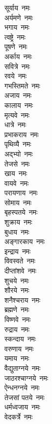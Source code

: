 \begin{multicols}{2}
    \begin{flushleft}
सूर्याय~नमः\\
अर्यमणे~नमः\\
भगाय~नमः\\
त्वष्ट्रे~नमः\\
पूषणे~नमः\\
अर्काय~नमः\\
सवित्रे~नमः\\
रवये~नमः\\
गभस्तिमते~नमः\\
अजाय~नमः\hfill{}\\
कालाय~नमः\\
मृत्यवे~नमः\\
धात्रे~नमः\\
प्रभाकराय~नमः\\
पृथिव्यै~नमः\\
अद्भ्यो~नमः\\
तेजसे~नमः\\
खाय~नमः\\
वायवे~नमः\\
परायणाय~नमः\hfill{}\\
सोमाय~नमः\\
बृहस्पतये~नमः\\
शुक्राय~नमः\\
बुधाय~नमः\\
अङ्गारकाय~नमः\\
इन्द्राय~नमः\\
विवस्वते~नमः\\
दीप्तांशवे~नमः\\
शुचये~नमः\\
शौरये~नमः\hfill{}\\
शनैश्चराय~नमः\\
ब्रह्मणे~नमः\\
विष्णवे~नमः\\
रुद्राय~नमः\\
स्कन्दाय~नमः\\
वरुणाय~नमः\\
यमाय~नमः\\
वैद्युताग्नये~नमः\\
जाठरश्चाग्नये~नमः\\
ऐन्धनग्नये~नमः\hfill{}\\
तेजसां पतये~नमः\\
धर्मध्वजाय~नमः\\
वेदकर्त्रे~नमः\\

\end{flushleft}
\end{multicols}
